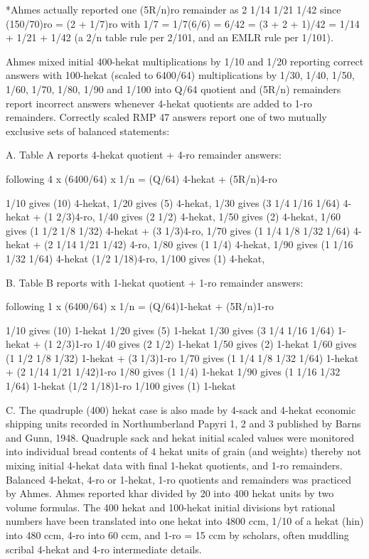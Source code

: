 \documentclass[12pt]{article}
\begin{document}
*Ahmes actually reported one (5R/n)ro remainder as 2 1/14 1/21 1/42 since (150/70)ro = (2 + 1/7)ro with 1/7 = 1/7(6/6) = 6/42 = (3 + 2 + 1)/42 = 1/14 + 1/21 + 1/42  (a 2/n table rule per 2/101, and an EMLR rule per 1/101).

Ahmes mixed initial 400-hekat multiplications by 1/10 and 1/20 reporting correct answers with 100-hekat (scaled to 6400/64) multiplications by 1/30, 1/40, 1/50, 1/60, 1/70, 1/80, 1/90 and 1/100 into Q/64 quotient and (5R/n) remainders report incorrect answers whenever 4-hekat quotients are added to 1-ro remainders. Correctly scaled RMP 47 answers report one of two mutually exclusive sets of balanced statements: 

A.  Table A reports 4-hekat quotient + 4-ro remainder answers: 

following 4 x (6400/64) x 1/n = (Q/64) 4-hekat + (5R/n)4-ro 

1/10 gives (10) 4-hekat,
1/20 gives (5) 4-hekat,
1/30 gives (3 1/4 1/16 1/64) 4-hekat + (1 2/3)4-ro,
1/40 gives (2 1/2) 4-hekat,
1/50 gives (2) 4-hekat,
1/60 gives (1 1/2 1/8 1/32) 4-hekat +  (3 1/3)4-ro,
1/70 gives (1 1/4 1/8 1/32 1/64) 4-hekat + (2 1/14 1/21 1/42) 4-ro,
1/80 gives (1 1/4) 4-hekat,
1/90 gives (1 1/16 1/32 1/64) 4-hekat (1/2 1/18)4-ro,
1/100 gives (1) 4-hekat, 


B. Table B reports with 1-hekat quotient + 1-ro remainder answers:

following 1 x (6400/64) x 1/n = (Q/64)1-hekat + (5R/n)1-ro 

1/10 gives (10) 1-hekat
1/20 gives (5) 1-hekat
1/30 gives (3 1/4 1/16 1/64) 1-hekat + (1 2/3)1-ro
1/40 gives (2 1/2) 1-hekat
1/50 gives (2) 1-hekat
1/60 gives (1 1/2 1/8 1/32) 1-hekat +  (3 1/3)1-ro
1/70 gives (1 1/4 1/8 1/32 1/64) 1-hekat + (2 1/14 1/21 1/42)1-ro
1/80 gives (1 1/4) 1-hekat
1/90 gives (1 1/16 1/32 1/64) 1-hekat (1/2 1/18)1-ro
1/100 gives (1) 1-hekat

C. The quadruple (400) hekat case is also made by 4-sack and 4-hekat economic shipping units recorded in Northumberland Papyri 1, 2 and 3 published by Barns and Gunn, 1948. Quadruple sack and hekat initial scaled values were monitored into individual bread contents of 4 hekat units of grain (and weights) thereby not mixing initial 4-hekat data with final 1-hekat quotients, and 1-ro remainders. Balanced 4-hekat, 4-ro or 1-hekat, 1-ro quotients and remainders was practiced by Ahmes.  Ahmes reported khar divided by 20 into 400 hekat units by two volume formulas. The 400 hekat and 100-hekat initial divisions byt rational numbers have been translated into one hekat into 4800 ccm, 1/10 of a hekat (hin) into 480 ccm, 4-ro into 60 ccm, and 1-ro = 15 ccm by scholars, often muddling scribal 4-hekat and 4-ro intermediate details.
 
\end{document}
